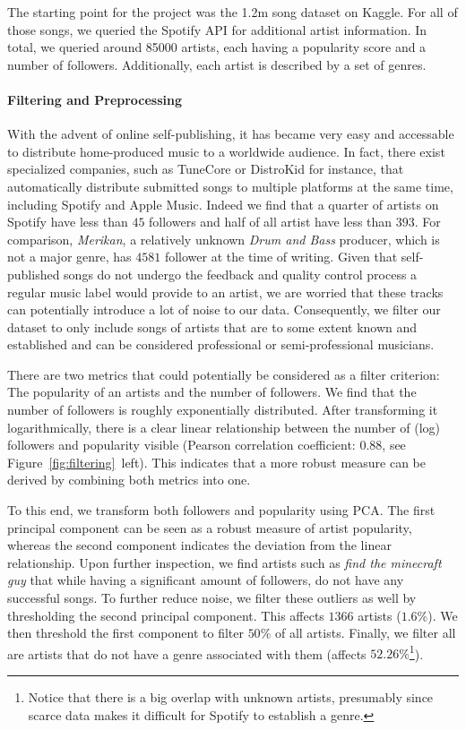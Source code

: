\documentclass{article}
\newcommand{\todo}[1]{{\color{red} #1}}
\begin{document}
The starting point for the project was the 1.2m song dataset on Kaggle. For all of those songs, we queried the Spotify API for additional artist information. In total, we queried around \num[]{85 000} artists, each having a popularity score and a number of followers. Additionally, each artist is described by a set of genres.

\paragraph{Filtering and Preprocessing}
With the advent of online self-publishing, it has became very easy and accessable to distribute home-produced music to a worldwide audience. In fact, there exist specialized companies, such as TuneCore or DistroKid for instance, that automatically distribute submitted songs to multiple platforms at the same time, including Spotify and Apple Music. Indeed we find that a quarter of artists on Spotify have less than $45$ followers and half of all artist have less than $393$. For comparison, \emph{Merikan}, a relatively unknown \emph{Drum and Bass} producer, which is not a major genre, has $4581$ follower at the time of writing. Given that self-published songs do not undergo the feedback and quality control process a regular music label would provide to an artist, we are worried that these tracks can potentially introduce a lot of noise to our data. Consequently, we filter our dataset to only include songs of artists that are to some extent known and established and can be considered professional or semi-professional musicians.

There are two metrics that could potentially be considered as a filter criterion: The popularity of an artists and the number of followers. We find that the number of followers is roughly exponentially distributed. After transforming it logarithmically, there is a clear linear relationship between the number of (log) followers and popularity visible (Pearson correlation coefficient: $0.88$, see Figure~\ref{fig:filtering}~left). This indicates that a more robust measure can be derived by combining both metrics into one.

To this end, we transform both followers and popularity using PCA. The first principal component can be seen as a robust measure of artist popularity, whereas the second component indicates the deviation from the linear relationship. Upon further inspection, we find artists such as \emph{\todo{find the minecraft guy}} that while having a significant amount of followers, do not have any successful songs. To further reduce noise, we filter these outliers as well by thresholding the second principal component. This affects $1366$ artists ($1.6\%$). We then threshold the first component to filter $50\%$ of all artists. Finally, we filter all are artists that do not have a genre associated with them (affects $52.26\%$\footnote{Notice that there is a big overlap with unknown artists, presumably since scarce data makes it difficult for Spotify to establish a genre.}).
\end{document}
